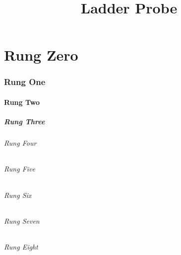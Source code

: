 \documentclass[type=zwischenbericht,theme=light]{zukunftbau}
\title{Ladder Probe}
\begin{document}
\part{Rung Zero}
\section{Rung One}
\subsection{Rung Two}
\subsubsection{Rung Three}
\begin{SemioNest}
\paragraph{Rung Four}
\begin{SemioNest}
\paragraph{Rung Five}
\begin{SemioNest}
\paragraph{Rung Six}
\begin{SemioNest}
\paragraph{Rung Seven}
\begin{SemioNest}
\paragraph{Rung Eight}
\end{SemioNest}
\end{SemioNest}
\end{SemioNest}
\end{SemioNest}
\end{SemioNest}
\end{document}
